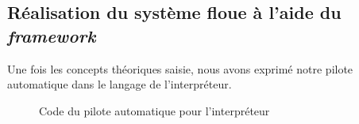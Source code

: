 \documentclass[a4paper,11pt]{article}
\begin{document}
    \subsection{Réalisation du système floue à l'aide du \textit{framework}}

    Une fois les concepts théoriques saisie, nous avons exprimé notre pilote automatique dans le langage de l’interpréteur.

    \begin{figure}[H]
        \begin{center}
            \caption{Code du pilote automatique pour l’interpréteur}
            
            \label{fig:codeAutoPilot}
        \end{center}
    \end{figure}
\end{document}
